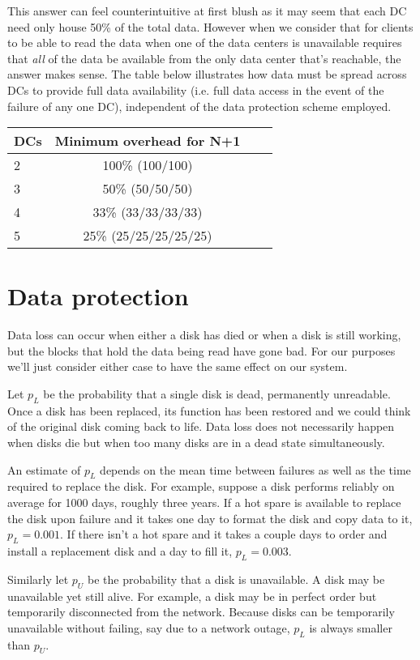 \documentclass[11pt]{article}
\begin{document}
This answer can feel counterintuitive at first blush as it may seem that each DC need only house 50\% of the total data. However when we consider that for clients to be able to read the data when one of the data centers is unavailable requires that \emph{all} of the data be available from the only data center that's reachable, the answer makes sense. The table below illustrates how data must be spread across DCs to provide full data availability (i.e. full data access in the event of the failure of any one DC), independent of the data protection scheme employed. 
 
\begin{tabular}{l*{2}{c}l}
DCs & Minimum overhead for N+1 \\
\hline
2 & 100\% (100/100) \\
3 & 50\% (50/50/50) \\
4 & 33\% (33/33/33/33) \\
5 & 25\% (25/25/25/25/25) \\
\end{tabular}

\section{Data protection}

Data loss can occur when either a disk has died or when a disk is still working, but the blocks that hold the data being read have gone bad. For our purposes we'll just consider either case to have the same effect on our system. 

Let $p_L$ be the probability that a single disk is dead, permanently unreadable. Once a disk has been replaced, its function has been restored and we could think of the original disk coming back to life. Data loss does not necessarily happen when disks die but when too many disks are in a dead state simultaneously.

An estimate of $p_L$ depends on the mean time between failures as well as the time required to replace the disk. For example, suppose a disk performs reliably on average for 1000 days, roughly three years. If a hot spare is available to replace the disk upon failure and it takes one day to format the disk and copy data to it, $p_L = 0.001$. If there isn't a hot spare and it takes a couple days to order and install a replacement disk and a day to fill it, $p_L = 0.003$. 

Similarly let $p_U$ be the probability that a disk is unavailable. A disk may be unavailable yet still alive. For example, a disk may be in perfect order but temporarily disconnected from the network. Because disks can be temporarily unavailable without failing, say due to a network outage, $p_L$ is always smaller than $p_U$.
\end{document}
